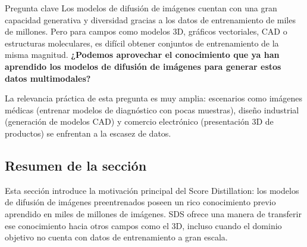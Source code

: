 \begin{importantbox}{Pregunta clave}
Los modelos de difusión de imágenes cuentan con una gran capacidad generativa y diversidad gracias a los datos de entrenamiento de miles de millones. Pero para campos como modelos 3D, gráficos vectoriales, CAD o estructuras moleculares, es difícil obtener conjuntos de entrenamiento de la misma magnitud. \textbf{¿Podemos aprovechar el conocimiento que ya han aprendido los modelos de difusión de imágenes para generar estos datos multimodales?}
\end{importantbox}

La relevancia práctica de esta pregunta es muy amplia: escenarios como imágenes médicas (entrenar modelos de diagnóstico con pocas muestras), diseño industrial (generación de modelos CAD) y comercio electrónico (presentación 3D de productos) se enfrentan a la escasez de datos.

\subsection{Resumen de la sección}

Esta sección introduce la motivación principal del Score Distillation: los modelos de difusión de imágenes preentrenados poseen un rico conocimiento previo aprendido en miles de millones de imágenes. SDS ofrece una manera de transferir ese conocimiento hacia otros campos como el 3D, incluso cuando el dominio objetivo no cuenta con datos de entrenamiento a gran escala.

\newpage
